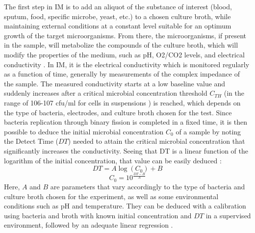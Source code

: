 The first step in IM is to add an aliquot of the substance of interest (blood, sputum, food, specific microbe, yeast, etc.) to a chosen culture broth, while maintaining external conditions at a constant level suitable for an optimum growth of the target microorganisms. From there, the microorganisms, if present in the sample, will metabolize the compounds of the culture broth, which will modify the properties of the medium, such as pH, O2/CO2 levels, and electrical conductivity \cite{Kargupta2018,Xu2016}. In IM, it is the electrical conductivity which is monitored regularly as a function of time, generally by measurements of the complex impedance of the sample. The measured conductivity starts at a low baseline value and suddenly increases after a critical microbial concentration threshold $C_{TH}$ (in the range of 106-107 cfu/ml for cells in suspensions \cite{Xu2016,Lei2014}) is reached, which depends on the type of bacteria, electrodes, and culture broth chosen for the test. Since bacteria replication through binary fission is completed in a fixed time, it is then possible to deduce the initial microbial concentration $C_0$ of a sample by noting the Detect Time ($DT$) needed to attain the critical microbial concentration that significantly increases the conductivity. Seeing that DT is a linear function of the logarithm of the initial concentration, that value can be easily deduced \cite{Grossi2009,Xu2016}:
\begin{equation}
DT = A \log(C_0) + B
\end{equation}
\begin{equation}
C_0 = 10^{\frac {DT-B}{A}}
\end{equation}
Here, $A$ and $B$ are parameters that vary accordingly to the type of bacteria and culture broth chosen for the experiment, as well as some environmental conditions such as pH and temperature. They can be deduced with a calibration using bacteria and broth with known initial concentration and $DT$ in a supervised environment, followed by an adequate linear regression \cite{stewart1899charges}. \par